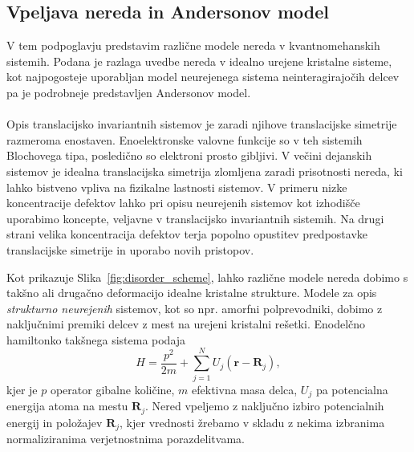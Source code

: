 \subsection{Vpeljava nereda in Andersonov model}
V tem podpoglavju predstavim različne modele nereda v kvantnomehanskih sistemih. Podana je razlaga uvedbe nereda v idealno urejene kristalne sisteme, kot najpogosteje uporabljan model neurejenega sistema neinteragirajočih delcev pa je podrobneje predstavljen Andersonov model. \\\\
Opis translacijsko invariantnih sistemov je zaradi njihove translacijske simetrije razmeroma enostaven. Enoelektronske valovne funkcije so v teh sistemih Blochovega tipa, posledično so elektroni prosto gibljivi. V večini dejanskih sistemov je idealna translacijska simetrija zlomljena zaradi prisotnosti nereda, ki lahko bistveno vpliva na fizikalne lastnosti sistemov. V primeru nizke koncentracije defektov lahko pri opisu neurejenih sistemov kot izhodišče uporabimo koncepte, veljavne v translacijsko invariantnih sistemih. Na drugi strani velika koncentracija defektov terja popolno opustitev predpostavke translacijske simetrije in uporabo novih pristopov. \\
\begin{minipage}[t]{0.54\textwidth}
Kot prikazuje Slika~\ref{fig:disorder_scheme}, lahko različne modele nereda dobimo s takšno ali drugačno deformacijo idealne kristalne strukture. Modele za opis \emph{strukturno neurejenih} sistemov, kot so npr. amorfni polprevodniki,  dobimo z naključnimi premiki delcev z mest na urejeni kristalni rešetki. Enodelčno hamiltonko takšnega sistema podaja 
\begin{equation}\label{eq:cont_ham}
H=\frac{p^2}{2m} + \sum\limits_{j=1}^N U_j(\textbf{r}- \textbf{R}_j), 
\end{equation}
kjer je $p$ operator gibalne količine, $m$ efektivna masa delca, $U_j$ pa potencialna energija atoma na mestu $\textbf{R}_j$. Nered vpeljemo z naključno izbiro potencialnih energij in položajev $\textbf{R}_j$, kjer vrednosti žrebamo v skladu z nekima izbranima normaliziranima verjetnostnima porazdelitvama. \\\\
\end{minipage}\hfill
